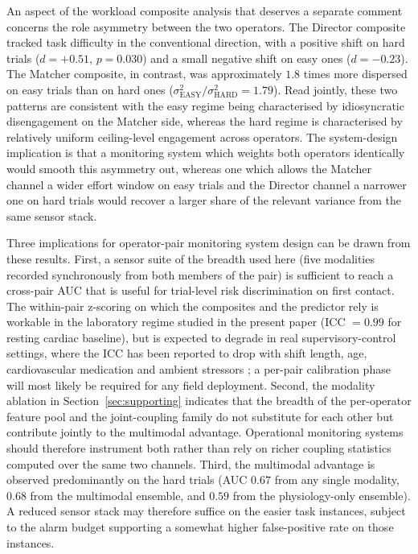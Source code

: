 An aspect of the workload composite analysis that deserves a separate comment concerns the role asymmetry between the two operators. The Director composite tracked task difficulty in the conventional direction, with a positive shift on hard trials ($d = +0.51$, $p = 0.030$) and a small negative shift on easy ones ($d = -0.23$). The Matcher composite, in contrast, was approximately $1.8$ times more dispersed on easy trials than on hard ones ($\sigma^2_{\text{EASY}} / \sigma^2_{\text{HARD}} = 1.79$). Read jointly, these two patterns are consistent with the easy regime being characterised by idiosyncratic disengagement on the Matcher side, whereas the hard regime is characterised by relatively uniform ceiling-level engagement across operators. The system-design implication is that a monitoring system which weights both operators identically would smooth this asymmetry out, whereas one which allows the Matcher channel a wider effort window on easy trials and the Director channel a narrower one on hard trials would recover a larger share of the relevant variance from the same sensor stack.

Three implications for operator-pair monitoring system design can be drawn from these results. First, a sensor suite of the breadth used here (five modalities recorded synchronously from both members of the pair) is sufficient to reach a cross-pair AUC that is useful for trial-level risk discrimination on first contact. The within-pair z-scoring on which the composites and the predictor rely is workable in the laboratory regime studied in the present paper (ICC $= 0.99$ for resting cardiac baseline), but is expected to degrade in real supervisory-control settings, where the ICC has been reported to drop with shift length, age, cardiovascular medication and ambient stressors \cite{koenig2016sex,quintana2016guidelines}; a per-pair calibration phase will most likely be required for any field deployment. Second, the modality ablation in Section~\ref{sec:supporting} indicates that the breadth of the per-operator feature pool and the joint-coupling family do not substitute for each other but contribute jointly to the multimodal advantage. Operational monitoring systems should therefore instrument both rather than rely on richer coupling statistics computed over the same two channels. Third, the multimodal advantage is observed predominantly on the hard trials (AUC $0.67$ from any single modality, $0.68$ from the multimodal ensemble, and $0.59$ from the physiology-only ensemble). A reduced sensor stack may therefore suffice on the easier task instances, subject to the alarm budget supporting a somewhat higher false-positive rate on those instances.

